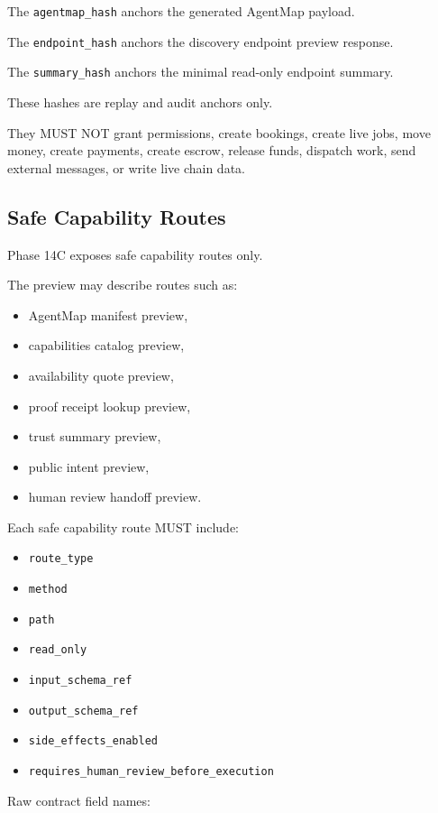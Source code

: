 \documentclass[11pt]{article}
\begin{document}
The \texttt{agentmap\_hash} anchors the generated AgentMap payload.

The \texttt{endpoint\_hash} anchors the discovery endpoint preview response.

The \texttt{summary\_hash} anchors the minimal read-only endpoint summary.

These hashes are replay and audit anchors only.

They MUST NOT grant permissions, create bookings, create live jobs, move money, create payments, create escrow, release funds, dispatch work, send external messages, or write live chain data.

\subsection{Safe Capability Routes}

Phase 14C exposes safe capability routes only.

The preview may describe routes such as:

\begin{itemize}
  \item AgentMap manifest preview,
  \item capabilities catalog preview,
  \item availability quote preview,
  \item proof receipt lookup preview,
  \item trust summary preview,
  \item public intent preview,
  \item human review handoff preview.
\end{itemize}

Each safe capability route MUST include:

\begin{itemize}
  \item \texttt{route\_type}
  \item \texttt{method}
  \item \texttt{path}
  \item \texttt{read\_only}
  \item \texttt{input\_schema\_ref}
  \item \texttt{output\_schema\_ref}
  \item \texttt{side\_effects\_enabled}
  \item \texttt{requires\_human\_review\_before\_execution}
\end{itemize}

Raw contract field names:
\end{document}
